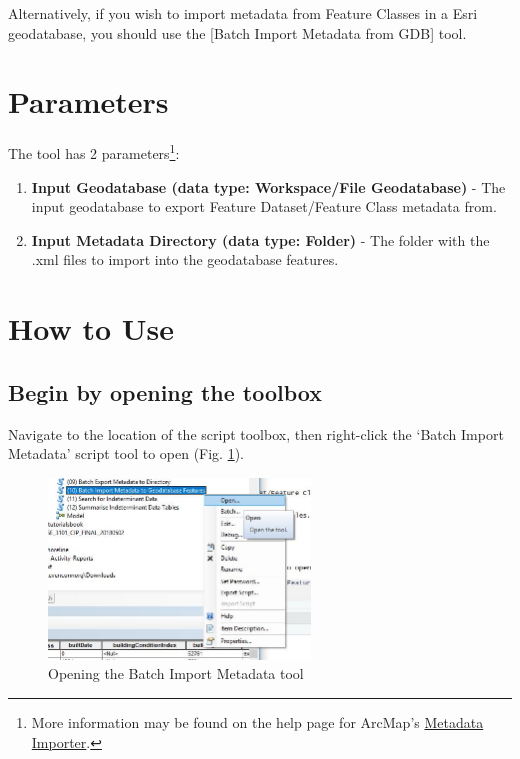 \documentclass[openany]{book}
\providecommand{\tightlist}{%
  \setlength{\itemsep}{0pt}\setlength{\parskip}{0pt}}
\let\rmarkdownfootnote\footnote%
\def\footnote{\protect\rmarkdownfootnote}
\theoremstyle{definition}
\theoremstyle{definition}
\theoremstyle{definition}
\theoremstyle{remark}
\begin{document}
Alternatively, if you wish to import metadata from Feature Classes in a
Esri geodatabase, you should use the {[}Batch Import Metadata from
GDB{]} tool.

\section{Parameters}\label{parameters-12}

The tool has 2 parameters\footnote{More information may be found on the
  help page for ArcMap's
  \href{http://desktop.arcgis.com/en/arcmap/latest/tools/conversion-toolbox/metadata-importer.htm}{Metadata
  Importer}.}:

\begin{enumerate}
\def\labelenumi{\arabic{enumi}.}
\tightlist
\item
  \textbf{Input Geodatabase (data type: Workspace/File Geodatabase)} -
  The input geodatabase to export Feature Dataset/Feature Class metadata
  from.
\item
  \textbf{Input Metadata Directory (data type: Folder)} - The folder
  with the .xml files to import into the geodatabase features.
\end{enumerate}

\section{How to Use}\label{how-to-use-12}

\subsection{Begin by opening the
toolbox}\label{begin-by-opening-the-toolbox-12}

Navigate to the location of the script toolbox, then right-click the
`Batch Import Metadata' script tool to open (Fig. \ref{fig:imMetaopen}).

\begin{figure}[H]

{\centering \includegraphics[width=2.74in,]{figures/imMeta-open} 

}

\caption{Opening the Batch Import Metadata tool}\label{fig:imMetaopen}
\end{figure}
\end{document}

